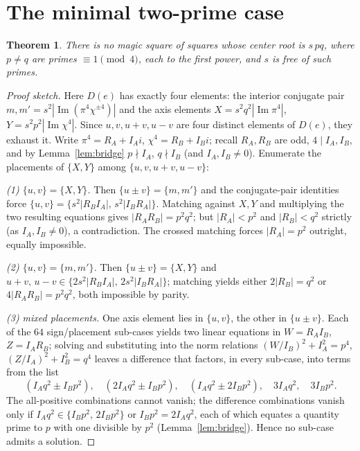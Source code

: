 \documentclass[11pt]{article}
\newtheorem{theorem}{Theorem}
\theoremstyle{remark}
\DeclareMathOperator{\im}{Im}
\begin{document}
\section{The minimal two-prime case}

\begin{theorem}\label{thm:minimal}
There is no magic square of squares whose center root is $s\,pq$, where
$p\neq q$ are primes $\equiv 1\pmod 4$, each to the first power, and $s$ is
free of such primes.
\end{theorem}

\begin{proof}[Proof sketch]
Here $D(e)$ has exactly four elements: the interior conjugate pair
$m,m' = s^2|\im(\pi^4\chi^{\pm4})|$ and the axis elements
$X=s^2q^2|\im\pi^4|$, $Y=s^2p^2|\im\chi^4|$.  Since $u,v,u+v,u-v$ are four
distinct elements of $D(e)$, they exhaust it.  Write $\pi^4=R_A+I_Ai$,
$\chi^4=R_B+I_Bi$; recall $R_A,R_B$ are odd, $4\mid I_A,I_B$, and by
Lemma~\ref{lem:bridge} $p\nmid I_A$, $q\nmid I_B$ (and $I_A,I_B\neq0$).
Enumerate the placements of $\{X,Y\}$ among $\{u,v,u+v,u-v\}$:

\emph{(1) $\{u,v\}=\{X,Y\}$.}  Then $\{u\pm v\}=\{m,m'\}$ and the
conjugate-pair identities force
$\{u,v\}=\{s^2|R_BI_A|,\,s^2|I_BR_A|\}$.  Matching against $X,Y$ and
multiplying the two resulting equations gives $|R_A R_B| = p^2q^2$; but
$|R_A|<p^2$ and $|R_B|<q^2$ strictly (as $I_A,I_B\neq0$), a contradiction.
The crossed matching forces $|R_A|=p^2$ outright, equally impossible.

\emph{(2) $\{u,v\}=\{m,m'\}$.}  Then $\{u\pm v\}=\{X,Y\}$ and
$u+v,\,u-v \in \{2s^2|R_BI_A|,\,2s^2|I_BR_A|\}$; matching yields either
$2|R_B|=q^2$ or $4|R_AR_B|=p^2q^2$, both impossible by parity.

\emph{(3) mixed placements.}  One axis element lies in $\{u,v\}$, the other
in $\{u\pm v\}$.  Each of the $64$ sign/placement sub-cases yields two linear
equations in $W=R_AI_B$, $Z=I_AR_B$; solving and substituting into the norm
relations $(W/I_B)^2+I_A^2=p^4$, $(Z/I_A)^2+I_B^2=q^4$ leaves a difference
that factors, in every sub-case, into terms from the list
\[
(I_Aq^2\pm I_Bp^2),\quad (2I_Aq^2\pm I_Bp^2),\quad (I_Aq^2\pm 2I_Bp^2),\quad
3I_Aq^2,\quad 3I_Bp^2 .
\]
The all-positive combinations cannot vanish; the difference combinations
vanish only if $I_Aq^2\in\{I_Bp^2,\,2I_Bp^2\}$ or $I_Bp^2 = 2I_Aq^2$, each of
which equates a quantity prime to $p$ with one divisible by $p^2$
(Lemma~\ref{lem:bridge}).  Hence no sub-case admits a solution.
\end{proof}
\end{document}
